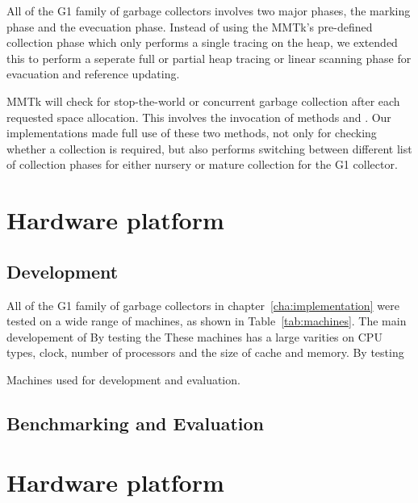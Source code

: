 All of the G1 family of garbage collectors involves two major phases, the marking phase
and the evecuation phase. Instead of using the MMTk's pre-defined 
collection phase which only performs a single tracing on the heap, we extended this
to perform a seperate full or partial heap tracing or linear scanning phase for
evacuation and reference updating.

MMTk will check for stop-the-world or concurrent garbage collection after each
requested space allocation.
This involves the invocation of methods 
and .
Our implementations made full use of these two methods,
not only for checking whether a collection is required,
but also performs switching between different list of collection phases
for either nursery or mature collection for the G1 collector.

\section{Hardware platform}
\label{sec:hardplat}

\subsection{Development}
 
All of the G1 family of garbage collectors in chapter~\ref{cha:implementation}
were tested on a wide range of machines, as shown in Table~\ref{tab:machines}.
The main developement of 
By testing the These machines has a large varities on CPU types, clock, number of processors and
the size of cache and memory. By testing 

\begin{table*}
  \centering
  \label{tab:machines}
  
  \caption{Machines used for development and evaluation.}
\end{table*}

\subsection{Benchmarking and Evaluation}



\section{Hardware platform}
\label{sec:hardplat}

